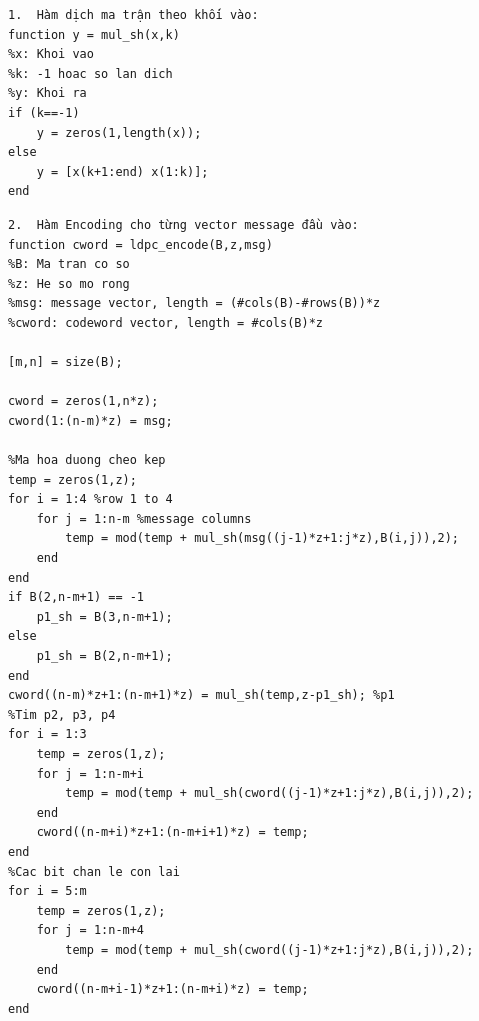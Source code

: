\documentclass{article}
\begin{document}
\begin{tcolorbox}
\begin{verbatim}
1.	Hàm dịch ma trận theo khối vào:
function y = mul_sh(x,k)
%x: Khoi vao
%k: -1 hoac so lan dich
%y: Khoi ra
if (k==-1)
    y = zeros(1,length(x));
else
    y = [x(k+1:end) x(1:k)];
end

\end{verbatim}
\end{tcolorbox}
\begin{tcolorbox}
\begin{verbatim}
2.	Hàm Encoding cho từng vector message đầu vào:
function cword = ldpc_encode(B,z,msg)
%B: Ma tran co so
%z: He so mo rong
%msg: message vector, length = (#cols(B)-#rows(B))*z
%cword: codeword vector, length = #cols(B)*z
 
[m,n] = size(B);
 
cword = zeros(1,n*z);
cword(1:(n-m)*z) = msg;
 
%Ma hoa duong cheo kep
temp = zeros(1,z);
for i = 1:4 %row 1 to 4
    for j = 1:n-m %message columns
        temp = mod(temp + mul_sh(msg((j-1)*z+1:j*z),B(i,j)),2);
    end
end
if B(2,n-m+1) == -1
    p1_sh = B(3,n-m+1);
else
    p1_sh = B(2,n-m+1);
end
cword((n-m)*z+1:(n-m+1)*z) = mul_sh(temp,z-p1_sh); %p1
%Tim p2, p3, p4
for i = 1:3
    temp = zeros(1,z);
    for j = 1:n-m+i
        temp = mod(temp + mul_sh(cword((j-1)*z+1:j*z),B(i,j)),2);
    end
    cword((n-m+i)*z+1:(n-m+i+1)*z) = temp;
end
%Cac bit chan le con lai
for i = 5:m
    temp = zeros(1,z);
    for j = 1:n-m+4
        temp = mod(temp + mul_sh(cword((j-1)*z+1:j*z),B(i,j)),2);        
    end
    cword((n-m+i-1)*z+1:(n-m+i)*z) = temp;    
end

\end{verbatim}
\end{tcolorbox}
    
\end{document}
